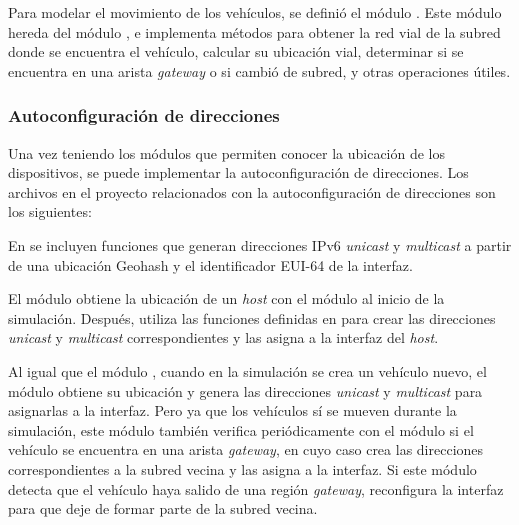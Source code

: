 Para modelar el movimiento de los vehículos, se definió el módulo
. Este módulo hereda del módulo , e
implementa métodos para obtener la red vial de la subred donde se encuentra el
vehículo, calcular su ubicación vial, determinar si se encuentra en una arista
\textit{gateway} o si cambió de subred, y otras operaciones útiles.


\subsubsection{Autoconfiguración de direcciones}

\label{subsubsec:autoconfiguracion_de_direcciones_sim}

Una vez teniendo los módulos que permiten conocer la ubicación de los
dispositivos, se puede implementar la autoconfiguración de direcciones. Los
archivos en el proyecto relacionados con la autoconfiguración de direcciones
son los siguientes:


En  se incluyen funciones que generan direcciones
IPv6 \textit{unicast} y \textit{multicast} a partir de una ubicación Geohash y
el identificador EUI-64 de la interfaz.

El módulo  obtiene la ubicación de un
\textit{host} con el módulo  al inicio de la
simulación. Después, utiliza las funciones definidas en
 para crear las direcciones \textit{unicast} y
\textit{multicast} correspondientes y las asigna a la interfaz
del \textit{host}.

Al igual que el módulo , cuando en la simulación
se crea un vehículo nuevo, el módulo  obtiene su
ubicación y genera las direcciones \textit{unicast} y \textit{multicast} para
asignarlas a la interfaz. Pero ya que los vehículos sí se mueven durante la
simulación, este módulo también verifica periódicamente con el módulo
 si el vehículo se encuentra en una arista \textit{gateway},
en cuyo caso crea las direcciones correspondientes a la subred vecina y las
asigna a la interfaz. Si este módulo detecta que el vehículo haya salido de una
región \textit{gateway}, reconfigura la interfaz para que deje de formar parte
de la subred vecina.

